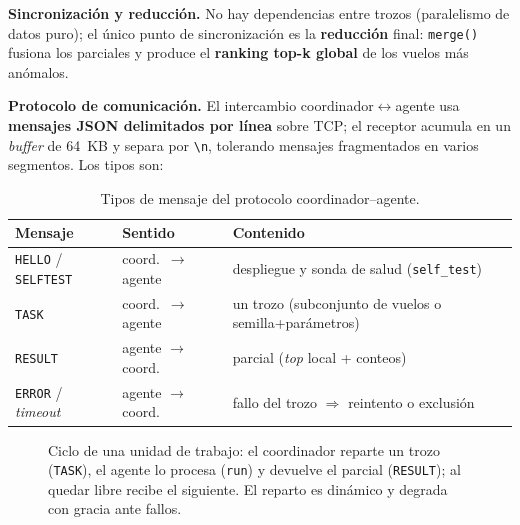 \documentclass[letterpaper,11pt]{article}
\begin{document}
\textbf{Sincronización y reducción.} No hay dependencias entre trozos (paralelismo de datos puro); el
único punto de sincronización es la \textbf{reducción} final: \texttt{merge()} fusiona los parciales y
produce el \textbf{ranking top-k global} de los vuelos más anómalos.

\textbf{Protocolo de comunicación.} El intercambio coordinador$\leftrightarrow$agente usa
\textbf{mensajes JSON delimitados por línea} sobre TCP; el receptor acumula en un \emph{buffer} de 64~KB y
separa por \texttt{\textbackslash n}, tolerando mensajes fragmentados en varios segmentos. Los tipos son:

\begin{table}[H]\centering\small
\caption{Tipos de mensaje del protocolo coordinador--agente.}
\label{tab:proto}
\begin{tabular}{lll}
\toprule
Mensaje & Sentido & Contenido \\
\midrule
\texttt{HELLO} / \texttt{SELFTEST} & coord.\ $\to$ agente & despliegue y sonda de salud (\texttt{self\_test}) \\
\texttt{TASK} & coord.\ $\to$ agente & un trozo (subconjunto de vuelos o semilla+parámetros) \\
\texttt{RESULT} & agente $\to$ coord. & parcial (\emph{top} local + conteos) \\
\texttt{ERROR} / \emph{timeout} & agente $\to$ coord. & fallo del trozo $\Rightarrow$ reintento o exclusión \\
\bottomrule
\end{tabular}
\end{table}

\begin{figure}[H]\centering
{}
\caption{Ciclo de una unidad de trabajo: el coordinador reparte un trozo (\texttt{TASK}), el agente lo
procesa (\texttt{run}) y devuelve el parcial (\texttt{RESULT}); al quedar libre recibe el siguiente. El
reparto es dinámico y degrada con gracia ante fallos.}
\label{fig:seq}
\end{figure}
\end{document}
